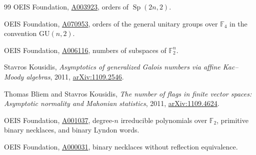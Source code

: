 \documentclass[11pt]{article}
\numberwithin{equation}{section}
\theoremstyle{definition}
\newcommand{\F}{\mathbb F}
\newcommand{\Sp}{\operatorname{Sp}}
\begin{document}
\begin{thebibliography}{99}
OEIS Foundation, \href{https://oeis.org/A003923}{A003923}, orders of $\Sp(2n,2)$.

OEIS Foundation, \href{https://oeis.org/A070953}{A070953}, orders of the general unitary groups over $\F_4$ in the convention $\mathrm{GU}(n,2)$.

OEIS Foundation, \href{https://oeis.org/A006116}{A006116}, numbers of subspaces of $\F_2^n$.

Stavros Kousidis, \emph{Asymptotics of generalized Galois numbers via affine Kac--Moody algebras}, 2011,
\href{https://arxiv.org/abs/1109.2546}{arXiv:1109.2546}.

Thomas Bliem and Stavros Kousidis, \emph{The number of flags in finite vector spaces: Asymptotic normality and Mahonian statistics}, 2011,
\href{https://arxiv.org/abs/1109.4624}{arXiv:1109.4624}.

OEIS Foundation, \href{https://oeis.org/A001037}{A001037}, degree-$n$ irreducible polynomials over $\F_2$, primitive binary necklaces, and binary Lyndon words.

OEIS Foundation, \href{https://oeis.org/A000031}{A000031}, binary necklaces without reflection equivalence.

\end{thebibliography}
\end{document}
